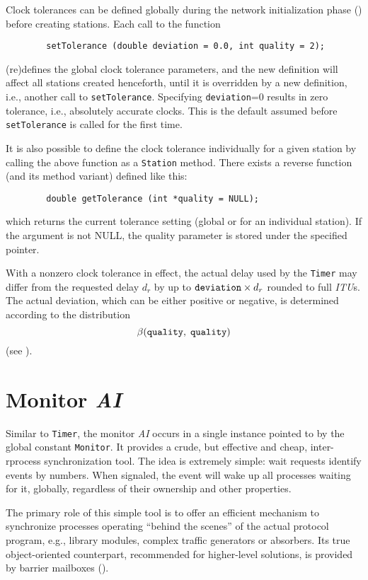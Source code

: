 Clock tolerances can be defined globally during the network initialization
phase () before creating stations.
Each call to the function
\begin{verbatim}
        setTolerance (double deviation = 0.0, int quality = 2);
\end{verbatim}
(re)defines the global clock tolerance parameters, and the new definition
will affect all stations
created henceforth, until it is overridden by a new definition, i.e.,
another call to {\tt setTolerance}.
Specifying {\tt deviation}=0 results in
zero tolerance, i.e., absolutely accurate clocks.
This is the default assumed before {\tt setTolerance} is called for the first
time.

It is also possible to define the clock tolerance individually for a given
station by calling the above function as a {\tt Station} method.
There exists a reverse function (and its method variant) defined like this:
\begin{verbatim}
        double getTolerance (int *quality = NULL);
\end{verbatim}
\noindent
which returns the current tolerance setting (global or for an individual
station).
If the argument is not NULL, the quality parameter is stored under the
specified pointer.

With a nonzero clock tolerance in effect, the actual delay used by the
{\tt Timer} may differ from the requested delay $d_r$
by up to 
${\tt deviation} \times d_r$ rounded to full {\em ITU\/}s.
The actual deviation, which can be either positive or negative,
is determined according to the distribution
\[
\beta ({\tt quality},\;{\tt quality})
\]
(see ).


\section{Monitor {\em AI\/}}
\label{rm_mo}

Similar to {\tt Timer}, the monitor {\em AI\/} occurs in a single
instance pointed to by the global constant {\tt Monitor}.
It provides a crude, but effective and cheap,
inter-rprocess synchronization tool.
The idea is extremely simple: wait requests identify events by numbers.
When signaled, the event will wake up all processes waiting for it, globally,
regardless of their ownership and other properties.

The primary role of this simple tool is to offer an efficient mechanism to
synchronize processes operating ``behind the scenes'' of the actual
protocol program, e.g., library modules, complex traffic generators or
absorbers.
Its true object-oriented counterpart, recommended for higher-level solutions,
is provided by barrier mailboxes ().

